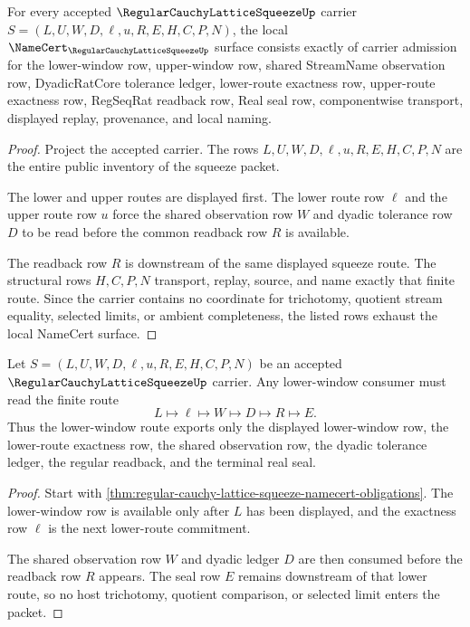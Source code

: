 \begin{theorem}
\label{thm:regular-cauchy-lattice-squeeze-namecert-obligations}
For every accepted $\RegularCauchyLatticeSqueezeUp$ carrier $S=(L,U,W,D,\ell,u,R,E,H,C,P,N)$, the local $\NameCert_{\RegularCauchyLatticeSqueezeUp}$ surface consists exactly of carrier admission for the lower-window row, upper-window row, shared StreamName observation row, DyadicRatCore tolerance ledger, lower-route exactness row, upper-route exactness row, RegSeqRat readback row, Real seal row, componentwise transport, displayed replay, provenance, and local naming.
\end{theorem}
\begin{proof}
Project the accepted carrier. The rows $L,U,W,D,\ell,u,R,E,H,C,P,N$ are the entire public inventory of the squeeze packet.

The lower and upper routes are displayed first. The lower route row $\ell$ and the upper route row $u$ force the shared observation row $W$ and dyadic tolerance row $D$ to be read before the common readback row $R$ is available.

The readback row $R$ is downstream of the same displayed squeeze route. The structural rows $H,C,P,N$ transport, replay, source, and name exactly that finite route. Since the carrier contains no coordinate for trichotomy, quotient stream equality, selected limits, or ambient completeness, the listed rows exhaust the local NameCert surface.
\end{proof}

\begin{theorem}
\label{thm:regular-cauchy-lattice-squeeze-lower-window-route}
Let $S=(L,U,W,D,\ell,u,R,E,H,C,P,N)$ be an accepted $\RegularCauchyLatticeSqueezeUp$ carrier. Any lower-window consumer must read the finite route
$$
L \longmapsto \ell \longmapsto W \longmapsto D \longmapsto R \longmapsto E .
$$
Thus the lower-window route exports only the displayed lower-window row, the lower-route exactness row, the shared observation row, the dyadic tolerance ledger, the regular readback, and the terminal real seal.
\end{theorem}
\begin{proof}
Start with \autoref{thm:regular-cauchy-lattice-squeeze-namecert-obligations}. The lower-window row is available only after $L$ has been displayed, and the exactness row $\ell$ is the next lower-route commitment.

The shared observation row $W$ and dyadic ledger $D$ are then consumed before the readback row $R$ appears. The seal row $E$ remains downstream of that lower route, so no host trichotomy, quotient comparison, or selected limit enters the packet.
\end{proof}


